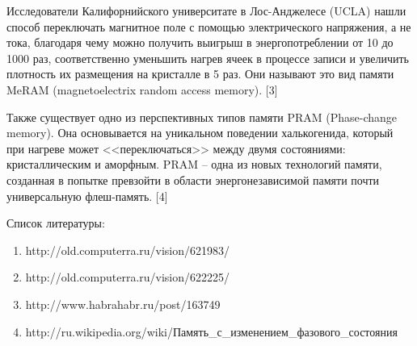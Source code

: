Исследователи Калифорнийского университате в Лос-Анджелесе (UCLA) нашли 
способ переключать магнитное поле с помощью электрического напряжения, а 
не тока, благодаря чему можно получить выигрыш в энергопотреблении от 
10 до 1000 раз, соответственно уменьшить нагрев ячеек в процессе записи 
и увеличить плотность их размещения на кристалле в 5 раз. Они называют 
это вид памяти MeRAM (magnetoelectrix random access memory). [3]


Также существует одно из перспективных типов памяти PRAM (Phase-change 
memory). Она основывается на уникальном поведении халькогенида, который 
при нагреве может <<переключаться>> между двумя состояниями: 
кристаллическим и аморфным. PRAM -- одна из новых технологий памяти, 
созданная в попытке превзойти в области энергонезависимой памяти почти 
универсальную флеш-память. [4]

\pagebreak

Список литературы:
\begin{enumerate}
	\item http://old.computerra.ru/vision/621983/
	\item http://old.computerra.ru/vision/622225/
	\item http://www.habrahabr.ru/post/163749
    \item http://ru.wikipedia.org/wiki/Память\_с\_изменением\_фазового\_состояния
\end{enumerate} 



